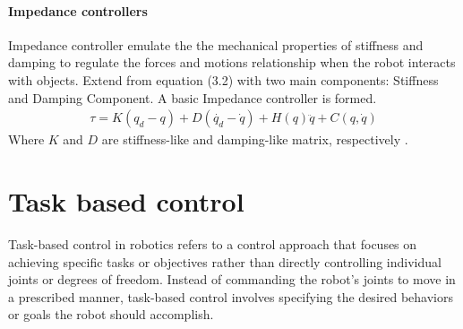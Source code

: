 \documentclass[report.tex]{subfiles}
\begin{document}
    \paragraph*{\large{Impedance controllers}\\}
    Impedance controller emulate the the mechanical properties of stiffness and damping to regulate the forces and motions relationship when the robot interacts with objects. Extend from equation (3.2) with two main components: Stiffness and Damping Component. A basic Impedance controller is formed.
    \begin{align}
            \tau  = K(q_d -q) + D (\dot{q_d} - \dot{q}) + H(q)\ddot{q}+ C(q,\dot{q})
    \end{align}
    Where $K$ and $D$ are stiffness-like and damping-like matrix, respectively \cite{song2017impedance}.
    \section{Task based control}
    Task-based control in robotics refers to a control approach that focuses on achieving specific tasks or objectives rather than directly controlling individual joints or degrees of freedom. Instead of commanding the robot's joints to move in a prescribed manner, task-based control involves specifying the desired behaviors or goals the robot should accomplish.
\end{document}
